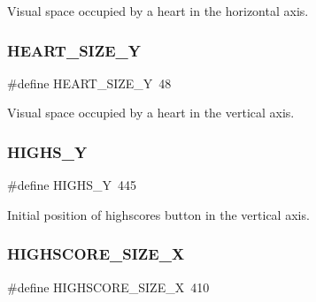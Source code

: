 Visual space occupied by a heart in the horizontal axis. 

\hypertarget{group___b_m_ps_holder_ga4353bbd4b002c88bdd587991a9a3a2ce}{}\label{group___b_m_ps_holder_ga4353bbd4b002c88bdd587991a9a3a2ce} 
\subsubsection{\texorpdfstring{H\+E\+A\+R\+T\+\_\+\+S\+I\+Z\+E\+\_\+Y}{HEART\_SIZE\_Y}}
{\footnotesize\ttfamily \#define H\+E\+A\+R\+T\+\_\+\+S\+I\+Z\+E\+\_\+Y~48}



Visual space occupied by a heart in the vertical axis. 

\hypertarget{group___b_m_ps_holder_gac1e57f1ff5614ef7f370bcc296db9bb7}{}\label{group___b_m_ps_holder_gac1e57f1ff5614ef7f370bcc296db9bb7} 
\subsubsection{\texorpdfstring{H\+I\+G\+H\+S\+\_\+Y}{HIGHS\_Y}}
{\footnotesize\ttfamily \#define H\+I\+G\+H\+S\+\_\+Y~445}



Initial position of highscores button in the vertical axis. 

\hypertarget{group___b_m_ps_holder_gaaa856bb92cc9efc1e6cffeee78fe19b6}{}\label{group___b_m_ps_holder_gaaa856bb92cc9efc1e6cffeee78fe19b6} 
\subsubsection{\texorpdfstring{H\+I\+G\+H\+S\+C\+O\+R\+E\+\_\+\+S\+I\+Z\+E\+\_\+X}{HIGHSCORE\_SIZE\_X}}
{\footnotesize\ttfamily \#define H\+I\+G\+H\+S\+C\+O\+R\+E\+\_\+\+S\+I\+Z\+E\+\_\+X~410}



